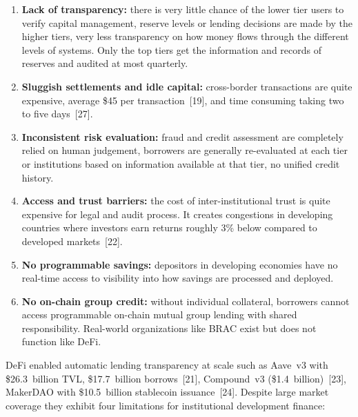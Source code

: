 \documentclass[12pt, a4paper]{report}
\begin{document}
\begin{enumerate}[noitemsep]
\item \textbf{Lack of transparency:} there is very little chance of the lower tier users to verify capital management, reserve levels or lending decisions are made by the higher tiers, very less transparency on how money flows through the different levels of systems. Only the top tiers get the information and records of reserves and audited at most quarterly.
\item \textbf{Sluggish settlements and idle capital:} cross-border transactions are quite expensive, average \$45 per transaction~[19], and time consuming taking two to five days~[27].
\item \textbf{Inconsistent risk evaluation:} fraud and credit assessment are completely relied on human judgement, borrowers are generally re-evaluated at each tier or institutions based on information available at that tier, no unified credit history.
\item \textbf{Access and trust barriers:} the cost of inter-institutional trust is quite expensive for legal and audit process. It creates congestions in developing countries where investors earn returns roughly 3\% below compared to developed markets~[22].
\item \textbf{No programmable savings:} depositors in developing economies have no real-time access to visibility into how savings are processed and deployed.
\item \textbf{No on-chain group credit:} without individual collateral, borrowers cannot access programmable on-chain mutual group lending with shared responsibility. Real-world organizations like BRAC exist but does not function like DeFi.
\end{enumerate}

DeFi enabled automatic lending transparency at scale such as Aave~v3 with \$26.3~billion TVL, \$17.7~billion borrows~[21], Compound~v3 (\$1.4~billion)~[23], MakerDAO with \$10.5~billion stablecoin issuance~[24]. Despite large market coverage they exhibit four limitations for institutional development finance:
\end{document}
